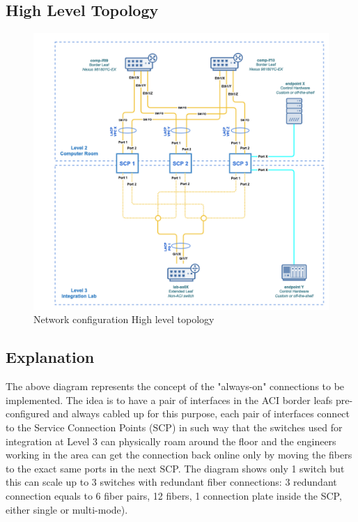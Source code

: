  \subsection{High Level Topology}
  \begin{figure}
    \includegraphics[width=14cm]{images/image-002.png}
    \centering
    \caption{Network configuration High level topology}
  \end{figure}

  \newpage
  \subsection{Explanation}
    The above diagram represents the concept of the "always-on" connections to be implemented. 
    The idea is to have a pair of interfaces in the ACI border leafs pre-configured and always cabled up for this purpose, each pair of interfaces connect to the Service Connection Points (SCP) in such way that the switches used for integration at Level 3 can physically roam around the floor and the engineers working in the area can get the connection back online only by moving the fibers to the exact same ports in the next SCP. 
    The diagram shows only 1 switch but this can scale up to 3 switches with redundant fiber connections: 3 redundant connection equals to 6 fiber pairs, 12 fibers, 1 connection plate inside the SCP, either single or multi-mode). 
  
